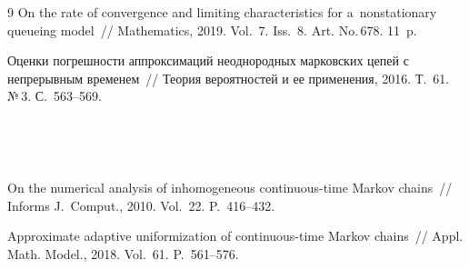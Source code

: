 {\small\frenchspacing
{%
\begin{thebibliography}{9}
On the rate of convergence and limiting characteristics for a~nonstationary queueing model~/\!\!/ 
Mathematics, 2019. Vol.~7. Iss.~8. Art. No.\,678. 11~p.

Оценки погрешности аппроксимаций неоднородных марковских цепей с непрерывным временем~/\!\!/ 
Теория вероятностей и ее применения, 2016. Т.~61. №\,3. С.~563--569.

\begin{figure} %
\vspace*{1pt}
\begin{center}
 \mbox{%
 \epsfxsize=128mm 
 }
 \end{center}
\vspace*{-15pt}
    \label{fp0}
\vspace*{1pt}
\begin{center}
 \mbox{%
 \epsfxsize=128.102mm 
 }
 \end{center}
\vspace*{-15pt}
    \label{fmean}
\end{figure}

 On the numerical analysis of inhomogeneous continuous-time 
Markov chains~/\!\!/ Informs J.~Comput., 2010. Vol.~22. P.~416--432.

Approximate adaptive uniformization of continuous-time Markov chains~/\!\!/ 
Appl. Math. Model., 2018. Vol.~61. P.~561--576.

     \end{thebibliography}
} }


\vspace*{-6pt}

